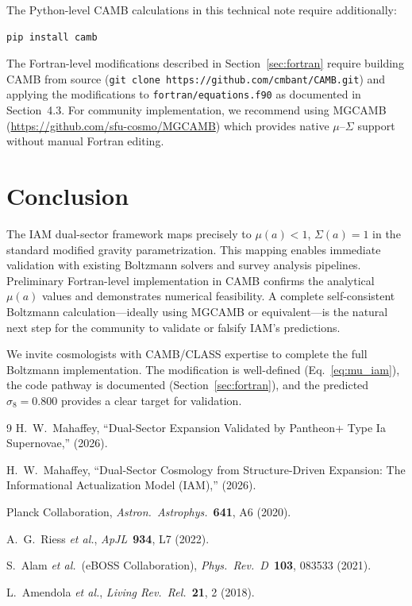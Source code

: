 \documentclass[11pt,letterpaper]{article}
\begin{document}
The Python-level CAMB calculations in this technical note require additionally:

\begin{lstlisting}[language=bash]
pip install camb
\end{lstlisting}

The Fortran-level modifications described in Section~\ref{sec:fortran} require building CAMB from source (\texttt{git clone https://github.com/cmbant/CAMB.git}) and applying the modifications to \texttt{fortran/equations.f90} as documented in Section~4.3. For community implementation, we recommend using MGCAMB (\url{https://github.com/sfu-cosmo/MGCAMB}) which provides native $\mu$--$\Sigma$ support without manual Fortran editing.

\section{Conclusion}

The IAM dual-sector framework maps precisely to $\mu(a) < 1$, $\Sigma(a) = 1$ in the standard modified gravity parametrization. This mapping enables immediate validation with existing Boltzmann solvers and survey analysis pipelines. Preliminary Fortran-level implementation in CAMB confirms the analytical $\mu(a)$ values and demonstrates numerical feasibility. A complete self-consistent Boltzmann calculation---ideally using MGCAMB or equivalent---is the natural next step for the community to validate or falsify IAM's predictions.

We invite cosmologists with CAMB/CLASS expertise to complete the full Boltzmann implementation. The modification is well-defined (Eq.~\ref{eq:mu_iam}), the code pathway is documented (Section~\ref{sec:fortran}), and the predicted $\sigma_8 = 0.800$ provides a clear target for validation.

\begin{thebibliography}{9}
H.~W.~Mahaffey, ``Dual-Sector Expansion Validated by Pantheon+ Type Ia Supernovae,'' (2026).

H.~W.~Mahaffey, ``Dual-Sector Cosmology from Structure-Driven Expansion: The Informational Actualization Model (IAM),'' (2026).

Planck Collaboration, \textit{Astron.\ Astrophys.}\ \textbf{641}, A6 (2020).

A.~G.~Riess \textit{et al.}, \textit{ApJL}\ \textbf{934}, L7 (2022).

S.~Alam \textit{et al.}\ (eBOSS Collaboration), \textit{Phys.\ Rev.\ D}\ \textbf{103}, 083533 (2021).

L.~Amendola \textit{et al.}, \textit{Living Rev.\ Rel.}\ \textbf{21}, 2 (2018).
\end{thebibliography}
\end{document}
